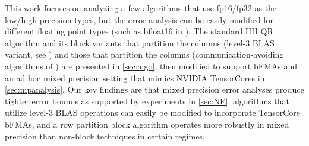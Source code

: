 This work focuses on analyzing a few algorithms that use fp16/fp32 as the low/high precision types, but the error analysis can be easily modified for different floating point types (such as bfloat16 in \cite{tagliavini2018floating}).
The standard HH QR algorithm and its block variants that partition the columns (level-3 BLAS variant, see \cite{golub2013matrix,Higham2002}) and those that partition the columns (communication-avoiding algorithms of \cite{Demmel2012}) are presented in \cref{sec:algo}, then modified to support bFMAs and an ad hoc mixed precision setting that mimics NVIDIA TensorCores in \cref{sec:mpanalysis}.
Our key findings are that mixed precision error analyses produce tighter error bounds as supported by experiments in \cref{sec:NE}, algorithms that utilize level-3 BLAS operations can easily be modified to incorporate TensorCore bFMAs, and a row partition block algorithm operates  more robustly in mixed precision than non-block techniques in certain regimes.
